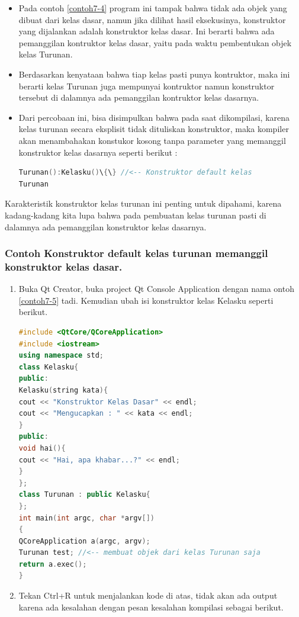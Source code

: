 \begin{itemize}
\item
  Pada contoh \ref{contoh7-4} program ini tampak bahwa tidak ada objek yang dibuat dari
  kelas dasar, namun jika dilihat hasil eksekusinya, konstruktor yang
  dijalankan adalah konstruktor kelas dasar. Ini berarti bahwa ada
  pemanggilan kontruktor kelas dasar, yaitu pada waktu pembentukan objek
  kelas Turunan.
\item
  Berdasarkan kenyataan bahwa tiap kelas pasti punya kontruktor, maka
  ini berarti kelas Turunan juga mempunyai kontruktor namun konstruktor
  tersebut di dalamnya ada pemanggilan kontruktor kelas dasarnya.
\item
  Dari percobaan ini, bisa disimpulkan bahwa pada saat dikompilasi,
  karena kelas turunan secara eksplisit tidak dituliskan konstruktor,
  maka kompiler akan menambahakan konstukor kosong tanpa parameter yang
  memanggil konstruktor kelas dasarnya seperti berikut :

\begin{lstlisting}[language=c++, numbers=none]
Turunan():Kelasku()\{\} //<-- Konstruktor default kelas
Turunan
\end{lstlisting}
  
\end{itemize}

Karakteristik konstruktor kelas turunan ini penting untuk dipahami,
karena kadang-kadang kita lupa bahwa pada pembuatan kelas turunan pasti
di dalamnya ada pemanggilan konstruktor kelas dasarnya.

\subsubsection*{Contoh  Konstruktor default kelas turunan memanggil konstruktor kelas dasar.}

\begin{enumerate}

\item
  Buka Qt Creator, buka project Qt Console Application dengan nama
  ontoh \ref{contoh7-5} tadi. Kemudian ubah isi konstruktor kelas Kelasku seperti
  berikut.

\begin{lstlisting}[language=c++, caption=Konstruktor default kelas turunan memanggil konstruktor kelas dasar, label=contoh7-5]
#include <QtCore/QCoreApplication>
#include <iostream>
using namespace std;
class Kelasku{
public:
Kelasku(string kata){
cout << "Konstruktor Kelas Dasar" << endl;
cout << "Mengucapkan : " << kata << endl;
}
public:
void hai(){
cout << "Hai, apa khabar...?" << endl;
}
};
class Turunan : public Kelasku{
};
int main(int argc, char *argv[])
{
QCoreApplication a(argc, argv);
Turunan test; //<-- membuat objek dari kelas Turunan saja
return a.exec();
}
\end{lstlisting}
\item
  Tekan Ctrl+R untuk menjalankan kode di atas, tidak akan ada output
  karena ada kesalahan dengan pesan kesalahan kompilasi sebagai berikut.
\end{enumerate}

